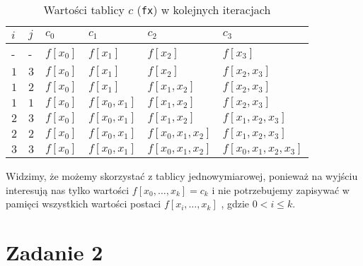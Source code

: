 \documentclass[a4paper]{article}
\begin{document}
    \begin{table}[H]
    \centering
    \begin{tabular}{l | l || l  l  l  l}
    $i$ & $j$ & $c_0$ & $c_1$ & $c_2$ & $c_3$ \\ \hline \hline
    - & - & $f[x_0]$ & $f[x_1]$ & $f[x_2]$ &  $f[x_3]$ \\ \hline
    $1$ & $3$ & $f[x_0]$ & $f[x_1]$ & $f[x_2]$ &  $f[x_2,x_3]$ \\
    $1$ & $2$ & $f[x_0]$ & $f[x_1]$ & $f[x_1,x_2]$ &  $f[x_2,x_3]$ \\
    $1$ & $1$ & $f[x_0]$ & $f[x_0,x_1]$ & $f[x_1,x_2]$ &  $f[x_2,x_3]$ \\ \hline
    $2$ & $3$ & $f[x_0]$ & $f[x_0,x_1]$ & $f[x_1,x_2]$ &  $f[x_1,x_2,x_3]$ \\
    $2$ & $2$ & $f[x_0]$ & $f[x_0,x_1]$ & $f[x_0,x_1,x_2]$ &  $f[x_1,x_2,x_3]$ \\ \hline
    $3$ & $3$ & $f[x_0]$ & $f[x_0,x_1]$ & $f[x_0,x_1,x_2]$ &  $f[x_0,x_1,x_2,x_3]$ \\

    \end{tabular}
    \caption{\label{table:1}Wartości tablicy $c$ (\texttt{fx}) w kolejnych iteracjach}
    \end{table}

    Widzimy, że możemy skorzystać z tablicy jednowymiarowej, ponieważ na wyjściu interesują nas tylko wartości $f[x_0,\dots, x_k] = c_k$ i nie potrzebujemy zapisywać w pamięci wszystkich wartości postaci $f[x_i,\dots, x_k]$ , gdzie $0 < i \leq k$. 
    
\section{Zadanie 2}
\end{document}
